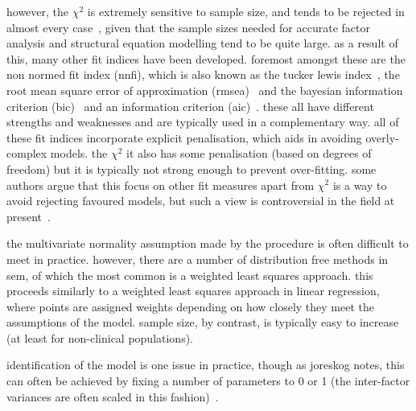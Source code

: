 however, the $\chi^2$ is extremely sensitive to sample size, and tends to be rejected in almost every case~\cite{henson2006use}, given that the sample sizes needed for accurate factor analysis and structural equation modelling tend to be quite large. as a result of this, many other fit indices have been developed. foremost amongst these are the non normed fit index (nnfi), which is also known as the tucker lewis index~\cite{bentler1990comparative}, the root mean square error of approximation (rmsea)~\cite{rigdon1996cfi} and the bayesian information criterion (bic)~\cite{schwarz1978estimating} and an information criterion (aic)~\cite{akaike1974new}. these all have different strengths and weaknesses and are typically used in a complementary way. all of these fit indices incorporate explicit penalisation, which aids in avoiding overly-complex models. the $\chi^2$ it also has some penalisation (based on degrees of freedom) but it is typically not strong enough to prevent over-fitting. some authors argue that this focus on other fit measures apart from $\chi^2$ is a way to avoid rejecting favoured models, but such a view is controversial in the field at present~\cite{barrett2007structural}.


the multivariate normality assumption made by the procedure is often difficult to meet in practice. however, there are a number of distribution free methods in sem, of which the most common is a weighted least squares approach. this proceeds similarly to a weighted least squares approach in linear regression, where points are assigned weights depending on how closely they meet the assumptions of the model. sample size, by contrast, is typically easy to increase (at least for non-clinical populations).

identification of the model is one issue in practice, though as joreskog notes, this can often be achieved by fixing a number of parameters to 0 or 1 (the inter-factor variances are often scaled in this fashion)~\cite{joreskog1978structural}.


